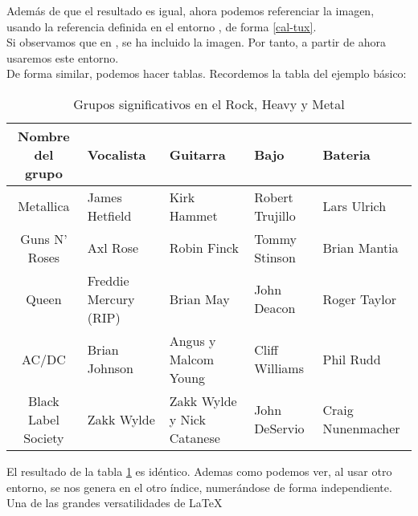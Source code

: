 Además de que el resultado es igual, ahora podemos referenciar la
imagen, usando la referencia definida en el entorno ,
de forma \ref{cal-tux}. \\

Si observamos que en , se ha incluido
la imagen. Por tanto, a partir de ahora usaremos este entorno.\\

De forma similar, podemos hacer tablas. Recordemos la tabla del
ejemplo básico:

\begin{table}[H]
  \label{metal}
  \begin{center}
  \begin{tabular}{| c ||m{2.2cm}|m{2.2cm}|m{2.2cm}|m{2.2cm}|}
    \hline
    Nombre del grupo & Vocalista & Guitarra & Bajo & Bateria\\
    \hline
    Metallica & James Hetfield & Kirk Hammet & Robert Trujillo & Lars
    Ulrich\\
    \hline
    Guns N' Roses & Axl Rose & Robin Finck & Tommy Stinson & Brian
    Mantia \\
    \hline
    Queen & Freddie Mercury (RIP) & Brian May & John Deacon & Roger
    Taylor\\
    \hline
    AC/DC & Brian Johnson & Angus y Malcom Young & Cliff Williams &
    Phil Rudd\\
    \hline
    Black Label Society & Zakk Wylde & Zakk Wylde y Nick Catanese &
    John DeServio & Craig Nunenmacher\\
    \hline
  \end{tabular}
\end{center}
\caption{Grupos significativos en el Rock, Heavy y Metal}
\end{table}

El resultado de la tabla \ref{metal} es idéntico. Ademas como podemos
ver, al usar otro entorno, se nos genera en el otro índice,
numerándose de forma independiente. Una de las grandes versatilidades
de \LaTeX